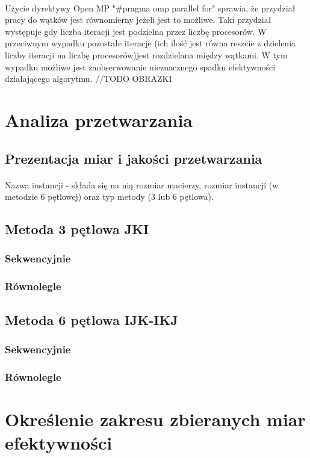 \documentclass{scrartcl}
\begin{document}
\paragraph{}Użycie dyrektywy Open MP "\#pragma omp parallel for" sprawia, że przydział pracy do wątków jest równomierny jeżeli jest to możliwe. Taki przydział występuje gdy liczba iteracji jest podzielna przez liczbę procesorów. W przeciwnym wypadku pozostałe iteracje (ich ilość jest równa reszcie z dzielenia liczby iteracji na liczbę procesorów)jest rozdzielana między wątkami. W tym wypadku możliwe jest zaobserwowanie nieznacznego spadku efektywności działającego algorytmu.
//TODO OBRAZKI
\section{Analiza przetwarzania}
\subsection{Prezentacja miar i jakości przetwarzania}
\paragraph{}
 Nazwa instancji - składa się na nią rozmiar macierzy, rozmiar instancji (w metodzie 6 pętlowej) oraz typ metody (3 lub 6 pętlowa).
\subsection{Metoda 3 pętlowa JKI}
\subsubsection{Sekwencyjnie}
\subsubsection{Równolegle}
\subsection{Metoda 6 pętlowa IJK-IKJ}
\subsubsection{Sekwencyjnie}
\subsubsection{Równolegle}
\section{Określenie zakresu zbieranych miar efektywności}
\end{document}
